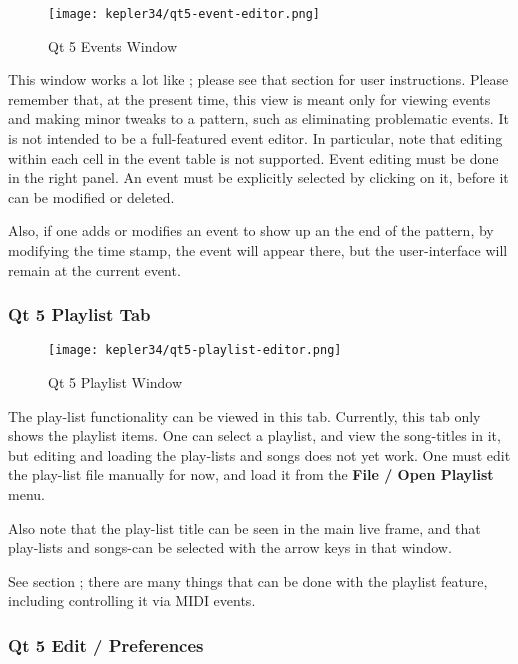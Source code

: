 \begin{figure}[H]
   \centering 
   \texttt{[image: kepler34/qt5-event-editor.png]}
   \caption{Qt 5 Events Window}
   \label{fig:qt5_events_window}
\end{figure}

   This window works a lot like ; please see
   that section for user instructions.  Please remember that, at the present
   time, this view is meant only for viewing events and making minor tweaks to
   a pattern, such as eliminating problematic events.  It is not intended to be
   a full-featured event editor.  In particular, note that editing within each
   cell in the event table is not supported.  Event editing must be done in the
   right panel.  An event must be explicitly selected by clicking on it, before
   it can be modified or deleted.

   Also, if one adds or modifies an event to show up an the end of the pattern,
   by modifying the time stamp, the event will appear there, but the
   user-interface will remain at the current event.

\subsubsection{Qt 5 Playlist Tab}
\label{subsubsec:qt_portmidi_qt5_playlist_tab}

\begin{figure}[H]
   \centering 
   \texttt{[image: kepler34/qt5-playlist-editor.png]}
   \caption{Qt 5 Playlist Window}
   \label{fig:qt5_playlist_window}
\end{figure}

   The play-list functionality can be viewed in this tab.
   Currently, this tab only shows the playlist items.  One can
   select a playlist, and view the song-titles in it, but
   editing and loading the play-lists and songs does not yet
   work.  One must edit the play-list file manually for now,
   and load it from the \textbf{File / Open Playlist} menu.

   Also note that the play-list title can be seen in the main live frame, 
   and that play-lists and songs-can be selected with the arrow keys in that
   window.

   See section ; there are many things that can be
   done with the playlist feature, including controlling it via MIDI events.

\subsubsection{Qt 5 Edit / Preferences}
\label{subsubsec:qt_portmidi_qt5_edit_prefs}

